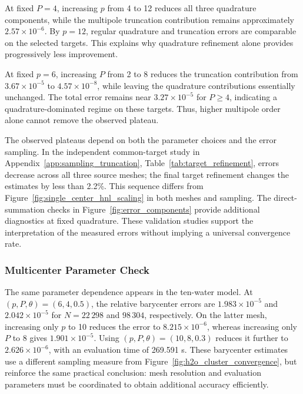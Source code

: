 \documentclass[a4paper,pdflatex,sn-mathphys-num]{sn-jnl}
\theoremstyle{thmstyleone}
\begin{document}
At fixed $P=4$, increasing $p$ from 4 to 12 reduces all three quadrature components, while the multipole truncation contribution remains approximately $2.57\times10^{-6}$. By $p=12$, regular quadrature and truncation errors are comparable on the selected targets. This explains why quadrature refinement alone provides progressively less improvement.

At fixed $p=6$, increasing $P$ from 2 to 8 reduces the truncation contribution from $3.67\times10^{-5}$ to $4.57\times10^{-8}$, while leaving the quadrature contributions essentially unchanged. The total error remains near $3.27\times10^{-5}$ for $P\geq4$, indicating a quadrature-dominated regime on these targets. Thus, higher multipole order alone cannot remove the observed plateau.

The observed plateaus depend on both the parameter choices and the error sampling. In the independent common-target study in Appendix~\ref{app:sampling_truncation}, Table~\ref{tab:target_refinement}, errors decrease across all three source meshes; the final target refinement changes the estimates by less than 2.2\%. This sequence differs from Figure~\ref{fig:single_center_hnl_scaling} in both meshes and sampling. The direct-summation checks in Figure~\ref{fig:error_components} provide additional diagnostics at fixed quadrature. These validation studies support the interpretation of the measured errors without implying a universal convergence rate.

\subsubsection{Multicenter Parameter Check}
\label{sec:multicenter_parameter_check}

The same parameter dependence appears in the ten-water model. At $(p,P,\theta)=(6,4,0.5)$, the relative barycenter errors are $1.983\times10^{-5}$ and $2.042\times10^{-5}$ for $N=22\,298$ and $98\,304$, respectively. On the latter mesh, increasing only $p$ to 10 reduces the error to $8.215\times10^{-6}$, whereas increasing only $P$ to 8 gives $1.901\times10^{-5}$. Using $(p,P,\theta)=(10,8,0.3)$ reduces it further to $2.626\times10^{-6}$, with an evaluation time of 269.591 s. These barycenter estimates use a different sampling measure from Figure~\ref{fig:h2o_cluster_convergence}, but reinforce the same practical conclusion: mesh resolution and evaluation parameters must be coordinated to obtain additional accuracy efficiently.

\end{document}
